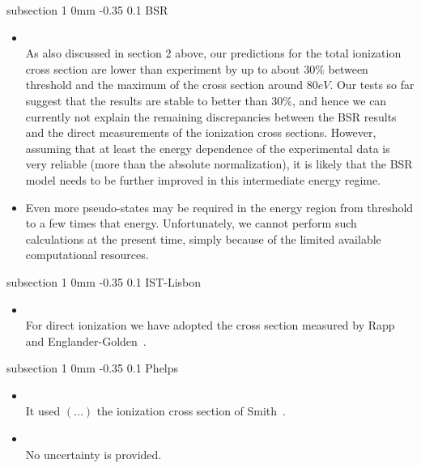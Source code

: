 \documentclass[11pt]{article}
\makeatletter
\renewcommand{\subsection}{\@startsection
{subsection}%
{1}%
{0mm}%
{-0.35\baselineskip}%
{0.1\baselineskip}%
{\normalfont\large\bfseries\color{myTan}}}%
\makeatother
\begin{document}
\subsection{BSR}
\begin{itemize}
\item \cite{Pitchford2013}\\
As also discussed in section 2 above, our predictions for the total ionization cross section are lower than experiment by up to about $30\%$ between threshold and the maximum of the cross section around $80eV$. Our tests so far suggest that the results are stable to better than $30\%$, and hence we can currently not explain the remaining discrepancies between the BSR results and the direct measurements of the ionization cross sections. However, assuming that at least the energy dependence of the experimental data is very reliable (more than the absolute normalization), it is likely that the BSR model needs to be further improved in this intermediate energy regime.
\item Even more pseudo-states may be required in the energy region from threshold to a few times that energy. Unfortunately, we cannot perform such calculations at the present time, simply because of the limited available computational resources.
\end{itemize}

\subsection{IST-Lisbon}
\begin{itemize}
\item \cite{Pitchford2013}\\
For direct ionization we have adopted the cross section measured by Rapp and Englander-Golden~\cite{Rapp1965}.
\end{itemize}

\subsection{Phelps}
\begin{itemize}
\item \cite{Pitchford2013}\\
It used $(\ldots)$ the ionization cross section of Smith~\cite{Smith1930}.
\item \cite{Smith1930}\\
No uncertainty is provided. 
\end{itemize}
\end{document}
